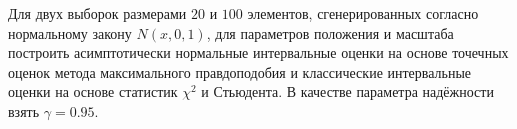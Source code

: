 Для двух выборок размерами $20$ и $100$ элементов, сгенерированных согласно нормальному закону $N(x,0,1)$,
для параметров положения и масштаба построить асимптотически нормальные интервальные оценки на основе точечных оценок
метода максимального правдоподобия и классические интервальные оценки на основе статистик $\chi^{2}$ и Стьюдента.
В качестве параметра надёжности взять $\gamma = 0.95$.